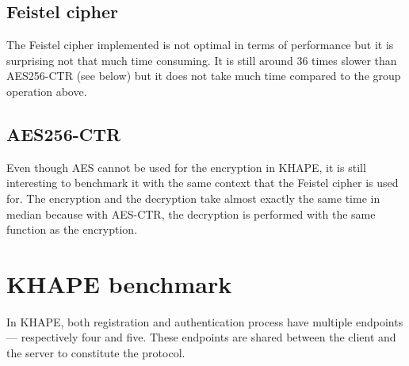 ﻿\documentclass[../report.tex]{subfiles}
\begin{document}
\pgfplotsset{width=\textwidth-0.1cm}
\pgfplotsset{height=6cm}


\subsection*{Feistel cipher}
The Feistel cipher implemented is not optimal in terms of performance but it is surprising not that much time consuming.
It is still around 36 times slower than AES256-CTR (see below) but it does not take much time compared to the group operation above.




\subsection*{AES256-CTR}
Even though AES cannot be used for the encryption in KHAPE, it is still interesting to benchmark it with the same context that the Feistel cipher is used for.
The encryption and the decryption take almost exactly the same time in median because with AES-CTR, the decryption is performed with the same function as the encryption.




\section{KHAPE benchmark} %
In KHAPE, both registration and authentication process have multiple endpoints --- respectively four and five. These endpoints are shared between the client and the server to constitute the protocol.
\end{document}

